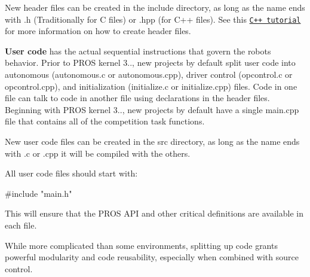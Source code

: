 New header files can be created in the include directory, as long as the name ends with {\ttfamily .h} (Traditionally for C files) or {\ttfamily .hpp} (for C++ files). See this \href{http://www.learncpp.com/cpp-tutorial/19-header-files/}{\tt C++ tutorial} for more information on how to create header files.

{\bfseries User code} has the actual sequential instructions that govern the robot\textquotesingle{}s behavior. Prior to P\+R\+OS kernel 3.., new projects by default split user code into autonomous ({\ttfamily autonomous.\+c} or {\ttfamily autonomous.\+cpp}), driver control ({\ttfamily opcontrol.\+c} or {\ttfamily opcontrol.\+cpp}), and initialization ({\ttfamily initialize.\+c} or {\ttfamily initialize.\+cpp}) files. Code in one file can talk to code in another file using declarations in the header files. Beginning with P\+R\+OS kernel 3.., new projects by default have a single {\ttfamily main.\+cpp} file that contains all of the competition task functions.

New user code files can be created in the {\ttfamily src} directory, as long as the name ends with {\ttfamily .c} or {\ttfamily .cpp} it will be compiled with the others.

All user code files should start with\+: \begin{DoxyVerb}#include "main.h"
\end{DoxyVerb}


This will ensure that the P\+R\+OS A\+PI and other critical definitions are available in each file.

While more complicated than some environments, splitting up code grants powerful modularity and code reusability, especially when combined with source control. 